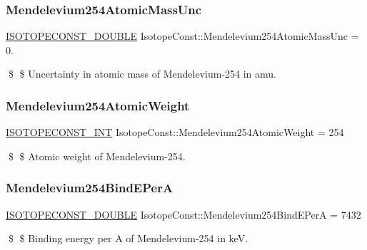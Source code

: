 \subsubsection{\texorpdfstring{Mendelevium254\+Atomic\+Mass\+Unc}{Mendelevium254AtomicMassUnc}}
{\footnotesize\ttfamily \mbox{\hyperlink{group___isotope_const-_macros_ga8f45a7272ce02c0b4c65c44636ed719a}{I\+S\+O\+T\+O\+P\+E\+C\+O\+N\+S\+T\+\_\+\+D\+O\+U\+B\+LE}} Isotope\+Const\+::\+Mendelevium254\+Atomic\+Mass\+Unc = 0.}

\$ \$ Uncertainty in atomic mass of Mendelevium-\/254 in amu. \mbox{\label{group___isotope_const-_mendelevium-_md254_ga56dbb2fb34fdbdd1665ccd1483652c84}} 
\subsubsection{\texorpdfstring{Mendelevium254\+Atomic\+Weight}{Mendelevium254AtomicWeight}}
{\footnotesize\ttfamily \mbox{\hyperlink{group___isotope_const-_macros_ga5f18360b3e99483a35c32d789e62621c}{I\+S\+O\+T\+O\+P\+E\+C\+O\+N\+S\+T\+\_\+\+I\+NT}} Isotope\+Const\+::\+Mendelevium254\+Atomic\+Weight = 254}

\$ \$ Atomic weight of Mendelevium-\/254. \mbox{\label{group___isotope_const-_mendelevium-_md254_ga45163465feacbea8c2c8fe27325a2481}} 
\subsubsection{\texorpdfstring{Mendelevium254\+Bind\+E\+PerA}{Mendelevium254BindEPerA}}
{\footnotesize\ttfamily \mbox{\hyperlink{group___isotope_const-_macros_ga8f45a7272ce02c0b4c65c44636ed719a}{I\+S\+O\+T\+O\+P\+E\+C\+O\+N\+S\+T\+\_\+\+D\+O\+U\+B\+LE}} Isotope\+Const\+::\+Mendelevium254\+Bind\+E\+PerA = 7432}

\$ \$ Binding energy per A of Mendelevium-\/254 in keV. \mbox{\label{group___isotope_const-_mendelevium-_md254_gaa6c5d04ae1e162695fbce854a7f75043}} 
